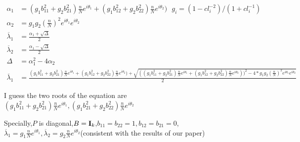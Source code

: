 \documentclass[11pt,a4paper]{article}
\begin{document}
$\begin{aligned}
   \alpha_1 &=(g_1b_{11}^2 + g_2 b_{21}^2)\frac{n}{N} e^{i\theta_1} + (g_1b_{12}^2 + g_2 b_{22}^2)\frac{n}{N} e^{i\theta_2})  \ \ \ g_i = (1-cl_i^{-2})/(1+cl_i^{-1}) \\
\alpha_2  &= g_1g_2(\frac{n}{N})^2 e^{i\theta_1} e^{i\theta_2} \\
\overline{\lambda}_1 &= \frac{\alpha_1+\sqrt{\Delta}}{2}\\
\overline{\lambda}_2 &= \frac{\alpha_1-\sqrt{\Delta}}{2}  \\
\Delta &= \alpha_1^2 - 4  \alpha_2 \\
\overline{\lambda}_1 &= \frac{(g_1b_{11}^2 + g_2 b_{21}^2)\frac{n}{N} e^{i\theta_1} 
+ (g_1b_{12}^2 + g_2 b_{22}^2)\frac{n}{N} e^{i\theta_2})+\sqrt{((g_1b_{11}^2 + g_2 b_{21}^2)\frac{n}{N} e^{i\theta_1} + (g_1b_{12}^2 + g_2 b_{22}^2)\frac{n}{N} e^{i\theta_2}))^2 - 4*g_1g_2(\frac{n}{N})^2 e^{i\theta_1} e^{i\theta_2} }}{2}
\end{aligned}$


I guess the two roots of the equation are $(g_1b_{11}^2 + g_2 b_{21}^2)\frac{n}{N} e^{i\theta_1},(g_1b_{21}^2 + g_2 b_{22}^2)\frac{n}{N} e^{i\theta_2}$


Specially,$P$ is diagonal,$B = \mathbf{I}_k$,$b_{11} = b_{22} = 1 , b_{12} = b_{21} =0$,$\overline{\lambda}_1 = g_1\frac{n}{N}e^{i\theta_1},\overline{\lambda}_2 = g_2\frac{n}{N}e^{i\theta_2}$(consistent with the results of our paper)
\end{document}
